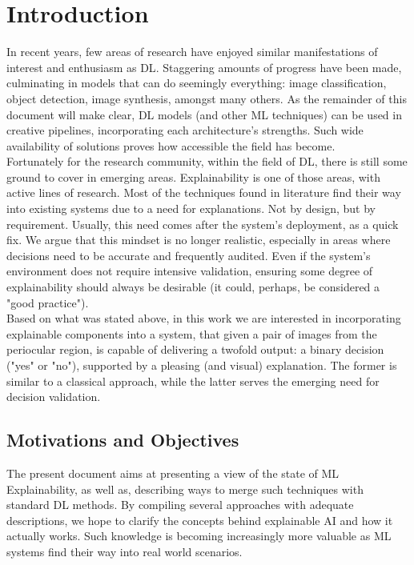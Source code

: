 \chapter{Introduction}
\label{chap1:introduction}

In recent years, few areas of research have enjoyed similar manifestations of interest and enthusiasm as \ac{DL}. Staggering amounts of progress have been made, culminating in models that can do seemingly everything: image classification, object detection, image synthesis, amongst many others. As the remainder of this document will make clear, \ac{DL} models (and other \ac{ML} techniques) can be used in creative pipelines, incorporating each architecture's strengths. Such wide availability of solutions proves how accessible the field has become.\\

Fortunately for the research community, within the field of \ac{DL}, there is still some ground to cover in emerging areas. Explainability is one of those areas, with active lines of research. Most of the techniques found in literature find their way into existing systems due to a need for explanations. Not by design, but by requirement. Usually, this need comes after the system's deployment, as a quick fix. We argue that this mindset is no longer realistic, especially in areas where decisions need to be accurate and frequently audited. Even if the system's environment does not require intensive validation, ensuring some degree of explainability should always be desirable (it could, perhaps, be considered a "good practice").\\

Based on what was stated above, in this work we are interested in incorporating explainable components into a system, that given a pair of images from the periocular region, is capable of delivering a twofold output: a binary decision ("yes" or "no"), supported by a pleasing (and visual) explanation. The former is similar to a classical approach, while the latter serves the emerging need for decision validation.

\section{Motivations and Objectives}
\label{sec:chap1_motivations_and_objectives}
The present document aims at presenting a view of the state of \ac{ML} Explainability, as well as, describing ways to merge such techniques with standard \ac{DL} methods. By compiling several approaches with adequate descriptions, we hope to clarify the concepts behind explainable \ac{AI} and how it actually works. Such knowledge is becoming increasingly more valuable as \ac{ML} systems find their way into real world scenarios. \\

